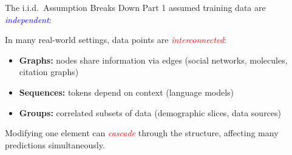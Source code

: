 \documentclass[aspectratio=169]{beamer}
\renewcommand{\emph}[1]{\textit{\textcolor{blue}{#1}}}
\newcommand{\remph}[1]{\textit{\textcolor{red}{#1}}}
\begin{document}
\begin{frame}{The i.i.d.\ Assumption Breaks Down}
    Part 1 assumed training data are \emph{independent}:

    \vspace{0.5cm}
    \begin{center}
    \end{center}

    \pause
    \vspace{0.5cm}
    In many real-world settings, data points are \remph{interconnected}:

    \vspace{0.3cm}
    \begin{itemize}
        \item \textbf{Graphs:} nodes share information via edges (social networks, molecules, citation graphs)
        \item \textbf{Sequences:} tokens depend on context (language models)
        \item \textbf{Groups:} correlated subsets of data (demographic slices, data sources)
    \end{itemize}

    \vspace{0.5cm}
    Modifying one element can \remph{cascade} through the structure, affecting many predictions simultaneously.
\end{frame}
\end{document}
